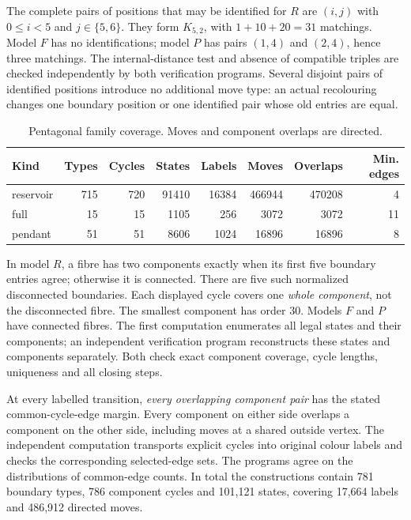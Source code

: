 The complete pairs of positions that may be identified for $R$ are $(i,j)$ with $0\le i<5$ and
$j\in\{5,6\}$. They form $K_{5,2}$, with
$1+10+20=31$ matchings. Model $F$ has no identifications; model $P$ has pairs
$(1,4)$ and $(2,4)$, hence three matchings. The internal-distance test
and absence of compatible triples are checked independently by both
verification programs. Several disjoint pairs of identified positions introduce no additional move
type: an actual recolouring changes one boundary position or one identified pair
whose old entries are equal.

\begin{table}[htbp]
\centering\small
\caption{Pentagonal family coverage. Moves and component overlaps are directed.}
\label{tab:pentagonal-reservoir-counts}
\begin{tabular}{lrrrrrrr}
\toprule
Kind & Types & Cycles & States & Labels & Moves & Overlaps & Min. edges\\
\midrule
reservoir&715&720&91410&16384&466944&470208&4\\
full&15&15&1105&256&3072&3072&11\\
pendant&51&51&8606&1024&16896&16896&8\\
\bottomrule
\end{tabular}
\end{table}

In model $R$, a fibre has two components exactly when its first five
boundary entries agree; otherwise it is connected. There are five such
normalized disconnected boundaries. Each displayed cycle covers one
\emph{whole component}, not the disconnected fibre. The smallest
component has order $30$. Models $F$ and $P$ have connected fibres.
The first computation enumerates all legal states and their components; an
independent verification program reconstructs these states and components separately.
Both check exact component coverage, cycle lengths, uniqueness and all
closing steps.

At every labelled transition, \emph{every overlapping component pair}
has the stated common-cycle-edge margin. Every component on either
side overlaps a component on the other side, including moves at a shared outside vertex. The independent computation transports explicit cycles into original colour labels and checks the corresponding selected-edge sets.
The programs agree on the distributions of common-edge counts. In total the constructions
contain 781 boundary types, 786 component cycles and 101,121 states,
covering 17,664 labels
and 486,912 directed moves.

